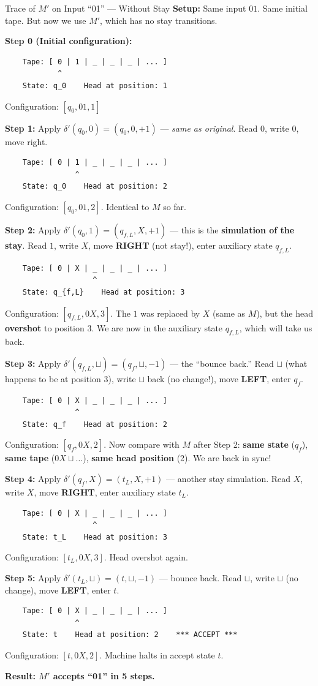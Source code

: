 \begin{examplebox}{Trace of $M'$ on Input ``01'' --- Without Stay}
\textbf{Setup:} Same input $01$. Same initial tape. But now we use $M'$, which has no stay transitions.

\textbf{Step 0 (Initial configuration):}
\begin{lstlisting}
    Tape: [ 0 | 1 | _ | _ | _ | ... ]
            ^
    State: q_0    Head at position: 1
\end{lstlisting}
Configuration: $[q_0, 01, 1]$

\textbf{Step 1:} Apply $\delta'(q_0, 0) = (q_0, 0, +1)$ --- \textit{same as original}. Read $0$, write $0$, move right.
\begin{lstlisting}
    Tape: [ 0 | 1 | _ | _ | _ | ... ]
                ^
    State: q_0    Head at position: 2
\end{lstlisting}
Configuration: $[q_0, 01, 2]$. Identical to $M$ so far.

\textbf{Step 2:} Apply $\delta'(q_0, 1) = (q_{f,L}, X, +1)$ --- this is the \textbf{simulation of the stay}. Read $1$, write $X$, move \textbf{RIGHT} (not stay!), enter auxiliary state $q_{f,L}$.
\begin{lstlisting}
    Tape: [ 0 | X | _ | _ | _ | ... ]
                    ^
    State: q_{f,L}    Head at position: 3
\end{lstlisting}
Configuration: $[q_{f,L}, 0X, 3]$. The $1$ was replaced by $X$ (same as $M$), but the head \textbf{overshot} to position 3. We are now in the auxiliary state $q_{f,L}$, which will take us back.

\textbf{Step 3:} Apply $\delta'(q_{f,L}, \sqcup) = (q_f, \sqcup, -1)$ --- the ``bounce back.'' Read $\sqcup$ (what happens to be at position 3), write $\sqcup$ back (no change!), move \textbf{LEFT}, enter $q_f$.
\begin{lstlisting}
    Tape: [ 0 | X | _ | _ | _ | ... ]
                ^
    State: q_f    Head at position: 2
\end{lstlisting}
Configuration: $[q_f, 0X, 2]$. Now compare with $M$ after Step 2: \textbf{same state} ($q_f$), \textbf{same tape} ($0X\sqcup\ldots$), \textbf{same head position} (2). We are back in sync!

\textbf{Step 4:} Apply $\delta'(q_f, X) = (t_L, X, +1)$ --- another stay simulation. Read $X$, write $X$, move \textbf{RIGHT}, enter auxiliary state $t_L$.
\begin{lstlisting}
    Tape: [ 0 | X | _ | _ | _ | ... ]
                    ^
    State: t_L    Head at position: 3
\end{lstlisting}
Configuration: $[t_L, 0X, 3]$. Head overshot again.

\textbf{Step 5:} Apply $\delta'(t_L, \sqcup) = (t, \sqcup, -1)$ --- bounce back. Read $\sqcup$, write $\sqcup$ (no change), move \textbf{LEFT}, enter $t$.
\begin{lstlisting}
    Tape: [ 0 | X | _ | _ | _ | ... ]
                ^
    State: t    Head at position: 2    *** ACCEPT ***
\end{lstlisting}
Configuration: $[t, 0X, 2]$. Machine halts in accept state $t$.

\textbf{Result: $M'$ accepts ``01'' in 5 steps.}
\end{examplebox}

